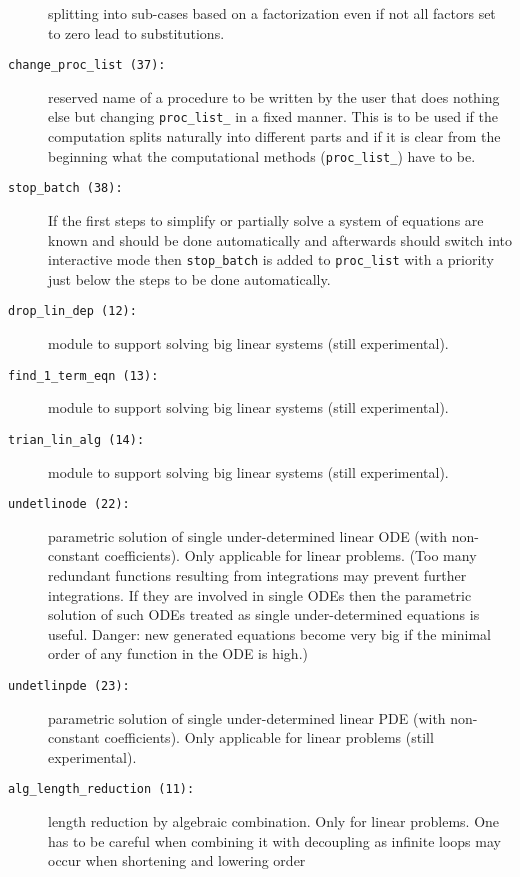 \begin{description}
  splitting into sub-cases based on a factorization even if not all
  factors set to zero lead to substitutions.
\item[\texttt{change\_proc\_list \hypertarget{crack-m_37}{(37)}:}]
  reserved name of a procedure to be written by the user that does
  nothing else but changing \texttt{proc\_list\_} in a fixed manner.
  This is to be used if the computation splits naturally into
  different parts and if it is clear from the beginning what the
  computational methods (\texttt{proc\_list\_}) have to be.
\item[\texttt{stop\_batch \hypertarget{crack-m_38}{(38)}:}] If the
  first steps to simplify or partially solve a system of equations are
  known and should be done automatically and afterwards
   should switch into interactive mode then
  \texttt{stop\_batch} is added to \texttt{proc\_list} with a priority
  just below the steps to be done automatically.
\item[\texttt{drop\_lin\_dep \hypertarget{crack-m_12}{(12)}:}] module
  to support solving big linear systems (still experimental).
\item[\texttt{find\_1\_term\_eqn \hypertarget{crack-m_13}{(13)}:}]
  module to support solving big linear systems (still experimental).
\item[\texttt{trian\_lin\_alg \hypertarget{crack-m_14}{(14)}:}] module
  to support solving big linear systems (still experimental).
\item[\texttt{undetlinode \hypertarget{crack-m_22}{(22)}:}] parametric
  solution of single under-determined linear ODE (with non-constant
  coefficients).  Only applicable for linear problems.  (Too many
  redundant functions resulting from integrations may prevent further
  integrations.  If they are involved in single ODEs then the
  parametric solution of such ODEs treated as single under-determined
  equations is useful.  Danger: new generated equations become very
  big if the minimal order of any function in the ODE is high.)
\item[\texttt{undetlinpde \hypertarget{crack-m_23}{(23)}:}] parametric
  solution of single under-determined linear PDE (with non-constant
  coefficients).  Only applicable for linear problems (still
  experimental).
\item[\texttt{alg\_length\_reduction \hypertarget{crack-m_11}{(11)}:}]
  length reduction by algebraic combination.  Only for linear
  problems.  One has to be careful when combining it with decoupling
  as infinite loops may occur when shortening and lowering order

\end{description}
